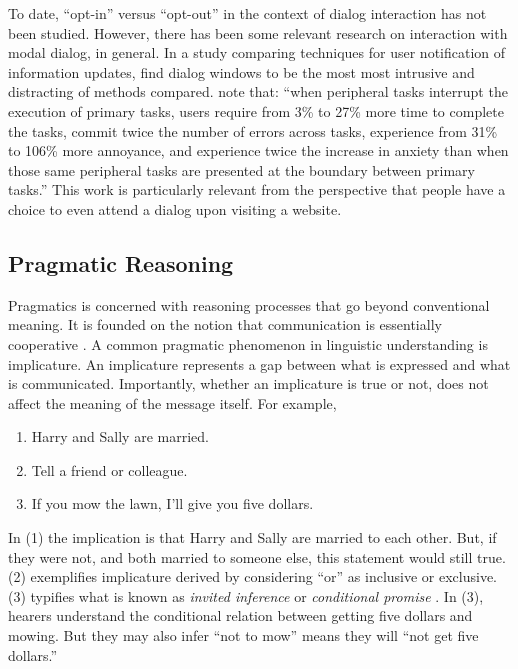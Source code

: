 To date, ``opt-in'' versus ``opt-out'' in the context of dialog interaction has not been studied. However, there has been some relevant research on interaction with modal dialog, in general. In a study comparing techniques for user notification of information updates,  \citet*{Bailey:2000up}  find dialog windows to be the most most intrusive and distracting of methods compared.  \citet{Bailey:2006bp}  note that: ``when peripheral tasks interrupt the execution of primary tasks, users require from 3\% to 27\% more time to complete the tasks, commit twice the number of errors across tasks, experience from 31\% to 106\% more annoyance, and experience twice the increase in anxiety than when those same peripheral tasks are presented at the boundary between primary tasks.'' This work is particularly relevant from the perspective that people have a choice to even attend a dialog upon visiting a website.

\subsection{Pragmatic Reasoning}
\label{pragmaticreasoning}

Pragmatics is concerned with reasoning processes that go beyond conventional meaning. It is founded on the notion that communication is essentially cooperative  \citep{Grice:1975vz,Levinson:1983ww,Clark:1996tm}. 
A common pragmatic phenomenon in linguistic understanding is implicature. An implicature represents a gap between what is expressed and what is communicated. Importantly, whether an implicature is true or not, does not affect the meaning of the message itself. For example,

\begin{enumerate}
\item Harry and Sally are married.
\item Tell a friend or colleague.
\item If you mow the lawn, I'll give you five dollars. 

\end{enumerate}

In (1) the implication is that Harry and Sally are married to each other. But, if they were not, and both married to someone else, this statement would still true. (2) exemplifies implicature derived by considering ``or'' as inclusive or exclusive. (3) typifies what is known as \emph{invited inference}  \citep{Geis:1971vb}  or \emph{conditional promise} \citep{Searle:1971vx}.  In (3), hearers understand the conditional relation between getting five dollars and mowing. But they may also infer ``not to mow'' means they will ``not get five dollars.'' 

